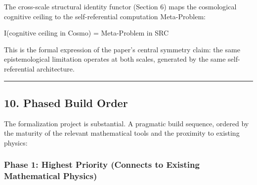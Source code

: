 \documentclass[
]{article}
\begin{document}
The cross-scale structural identity functor (Section 6) maps the
cosmological cognitive ceiling to the self-referential computation
Meta-Problem:

I(cognitive ceiling in Cosmo) = Meta-Problem in SRC

This is the formal expression of the paper's central symmetry claim: the
same epistemological limitation operates at both scales, generated by
the same self-referential architecture.

\begin{center}\rule{0.5\linewidth}{0.5pt}\end{center}

\hypertarget{phased-build-order}{%
\subsection{10. Phased Build Order}\label{phased-build-order}}

The formalization project is substantial. A pragmatic build sequence,
ordered by the maturity of the relevant mathematical tools and the
proximity to existing physics:

\hypertarget{phase-1-highest-priority-connects-to-existing-mathematical-physics}{%
\subsubsection{Phase 1: Highest Priority (Connects to Existing
Mathematical
Physics)}\label{phase-1-highest-priority-connects-to-existing-mathematical-physics}}
\end{document}
